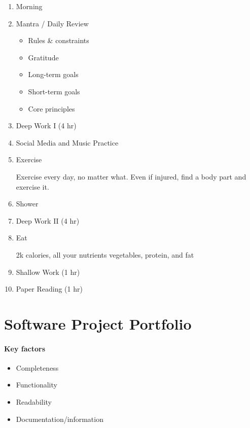 \begin{enumerate}
\item
	Morning

\item
	Mantra / Daily Review
	\begin{itemize}
	\item
		Rules \& constraints
	\item
		Gratitude
	\item
		Long-term goals
	\item
		Short-term goals
	\item
		Core principles
	\end{itemize}

\item
	Deep Work I (4 hr)

\item
	Social Media and Music Practice

\item
	Exercise

	Exercise every day, no matter what. Even if injured, find a body part and exercise it.

\item
	Shower

\item
	Deep Work II (4 hr)

\item
	Eat

	2k calories, all your nutrients
	vegetables, protein, and fat

\item
	Shallow Work (1 hr)

\item
	Paper Reading (1 hr)

\end{enumerate}

\section{Software Project Portfolio}
\paragraph*{Key factors}
\begin{itemize}
\item Completeness
\item Functionality
\item Readability
\item Documentation/information

\end{itemize}

